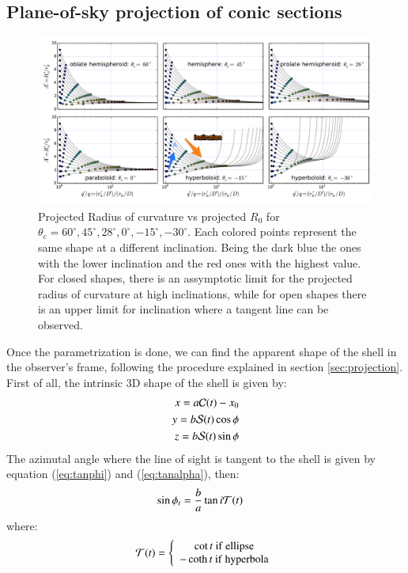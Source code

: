 \subsection{Plane-of-sky projection of conic sections} 
\begin{figure}
\includegraphics[width=0.9\linewidth]{annotated}
\caption{Projected Radius of curvature vs projected $R_0$ for $\theta_c=60^\circ,45^\circ,28^\circ, 0^\circ,-15^\circ,-30^\circ$. Each colored points represent
the same shape at a different inclination. Being the dark blue the ones with the lower inclination and the red ones with the highest value. For closed shapes, there is
an assymptotic limit for the projected radius of curvature at high inclinations, while for open shapes there is an upper limit for inclination where a tangent line can be observed.}
\label{fig:Apqp}
\end{figure}

Once the parametrization is done, we can find the apparent shape of
the shell in the observer's frame, following the procedure explained
in section \ref{sec:projection}.  First of all, the intrinsic 3D shape of the shell is given by:
\begin{align}
x = a\mathcal{C}(t)-x_0 \\ 
y = b\mathcal{S}(t)\cos\phi \\
z =  b\mathcal{S}(t)\sin\phi
\end{align}
The azimutal angle where the line of sight is tangent to the shell is given by equation (\ref{eq:tanphi}) and (\ref{eq:tanalpha}), then:
\begin{align}
\sin\phi_t &= \frac{b}{a}\tan i\mathcal{T}(t) 
\end{align}
where:
\begin{align}
\mathcal{T}(t) = \left\lbrace \begin{array}{c}
\cot t ~\mathrm{if~ellipse} \\
-\coth t ~\mathrm{if~hyperbola}
\end{array}\right.
\end{align}

